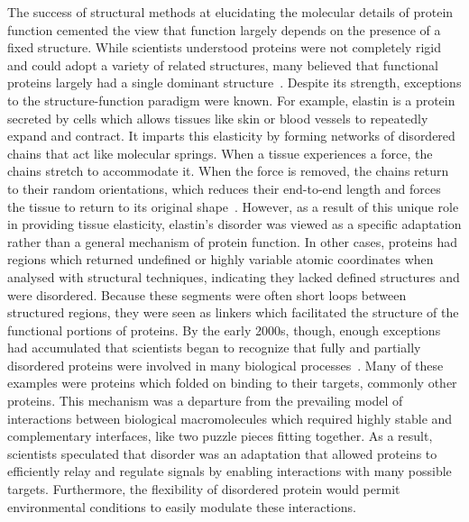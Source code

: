 The success of structural methods at elucidating the molecular details of protein function cemented the view that function largely depends on the presence of a fixed structure. While scientists understood proteins were not completely rigid and could adopt a variety of related structures, many believed that functional proteins largely had a single dominant structure~\cite{Karush1950}. Despite its strength, exceptions to the structure-function paradigm were known. For example, elastin is a protein secreted by cells which allows tissues like skin or blood vessels to repeatedly expand and contract. It imparts this elasticity by forming networks of disordered chains that act like molecular springs. When a tissue experiences a force, the chains stretch to accommodate it. When the force is removed, the chains return to their random orientations, which reduces their end-to-end length and forces the tissue to return to its original shape~\cite{Vrhovski1998, Alberts2014}. However, as a result of this unique role in providing tissue elasticity, elastin's disorder was viewed as a specific adaptation rather than a general mechanism of protein function. In other cases, proteins had regions which returned undefined or highly variable atomic coordinates when analysed with structural techniques, indicating they lacked defined structures and were disordered. Because these segments were often short loops between structured regions, they were seen as linkers which facilitated the structure of the functional portions of proteins. By the early 2000s, though, enough exceptions had accumulated that scientists began to recognize that fully and partially disordered proteins were involved in many biological processes~\cite{Plaxco1997, Wright1999, Dunker2001}. Many of these examples were proteins which folded on binding to their targets, commonly other proteins. This mechanism was a departure from the prevailing model of interactions between biological macromolecules which required highly stable and complementary interfaces, like two puzzle pieces fitting together. As a result, scientists speculated that disorder was an adaptation that allowed proteins to efficiently relay and regulate signals by enabling interactions with many possible targets. Furthermore, the flexibility of disordered protein would permit environmental conditions to easily modulate these interactions.

